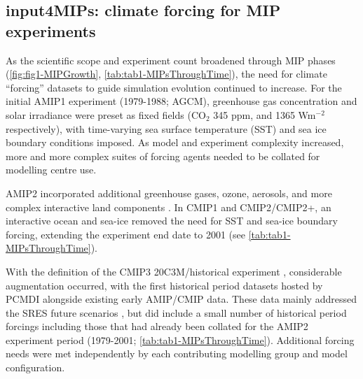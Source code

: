 \documentclass[manuscript]{copernicus}
\begin{document}
\subsection{input4MIPs: climate forcing for MIP experiments}
\label{sec:CMIP6SupportingProjects-input4MIPs}

As the scientific scope and experiment count broadened through MIP phases (\autoref{fig:fig1-MIPGrowth}, \autoref{tab:tab1-MIPsThroughTime}), the need for climate ``forcing'' datasets to guide simulation evolution continued to increase. For the initial AMIP1 experiment (1979-1988; AGCM), greenhouse gas concentration and solar irradiance were preset as fixed fields (CO$_{2}$ 345 ppm, and 1365 Wm$^{-2}$ respectively), with time-varying sea surface temperature (SST) and sea ice boundary conditions imposed. As model and experiment complexity increased, more and more complex suites of forcing agents needed to be collated for modelling centre use.

AMIP2 incorporated additional greenhouse gases, ozone, aerosols, and more complex interactive land components \citep[e.g.,][]{gleckler_amip_1996-1,liang_pcmdi_1997}. In CMIP1 and CMIP2/CMIP2+, an interactive ocean and sea-ice removed the need for SST and sea-ice boundary forcing, extending the experiment end date to 2001 (see \autoref{tab:tab1-MIPsThroughTime}).

With the definition of the CMIP3 20C3M/historical experiment \citep[$\sim$1850-2000;][]{meehl_wcrp_2007}, considerable augmentation occurred, with the first historical period datasets hosted by PCMDI alongside existing early AMIP/CMIP data. These data mainly addressed the SRES future scenarios \citep[2001-2100/2200/2300;][]{nakicenovic_summary_2000}, but did include a small number of historical period forcings including those that had already been collated for the AMIP2 experiment period (1979-2001; \autoref{tab:tab1-MIPsThroughTime}). Additional forcing needs were met independently by each contributing modelling group and model configuration.
\end{document}
